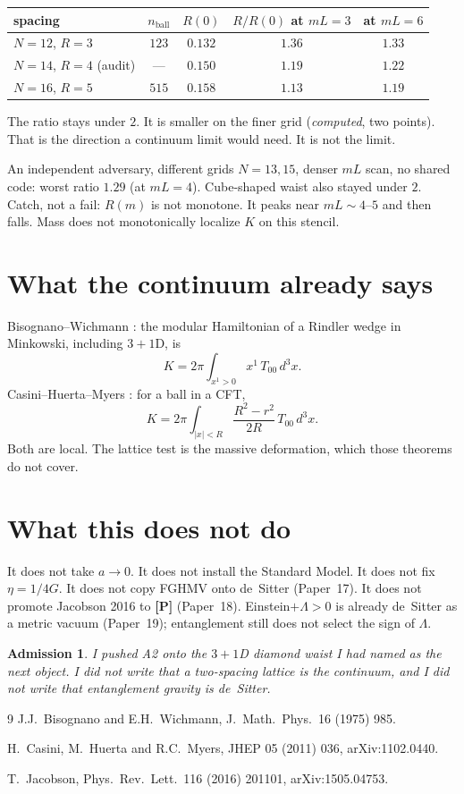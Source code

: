 \documentclass[11pt]{article}
\newcommand{\pP}{\textbf{[P]}}
\newtheorem*{admission}{Admission}
\begin{document}
\begin{center}
\begin{tabular}{lcccc}
\hline
spacing & $n_{\mathrm{ball}}$ & $R(0)$ & $R/R(0)$ at $mL=3$ & at $mL=6$ \\
\hline
$N=12$, $R=3$ & $123$ & $0.132$ & $1.36$ & $1.33$ \\
$N=14$, $R=4$ (audit) & --- & $0.150$ & $1.19$ & $1.22$ \\
$N=16$, $R=5$ & $515$ & $0.158$ & $1.13$ & $1.19$ \\
\hline
\end{tabular}
\end{center}

The ratio stays under $2$. It is smaller on the finer grid
(\emph{computed}, two points). That is the direction a continuum
limit would need. It is not the limit.

An independent adversary, different grids $N=13,15$, denser $mL$
scan, no shared code: worst ratio $1.29$ (at $mL=4$). Cube-shaped
waist also stayed under $2$. Catch, not a fail: $R(m)$ is not
monotone. It peaks near $mL\sim 4$--$5$ and then falls. Mass does
not monotonically localize $K$ on this stencil.

\section{What the continuum already says}

Bisognano--Wichmann \cite{BW1975}: the modular Hamiltonian of a
Rindler wedge in Minkowski, including $3{+}1$D, is
\[
K=2\pi\int_{x^1>0}x^1\,T_{00}\,d^3x.
\]
Casini--Huerta--Myers \cite{CHM2011}: for a ball in a CFT,
\[
K=2\pi\int_{|x|<R}\frac{R^2-r^2}{2R}\,T_{00}\,d^3x.
\]
Both are local. The lattice test is the massive deformation, which
those theorems do not cover.

\section{What this does not do}

It does not take $a\to 0$. It does not install the Standard Model.
It does not fix $\eta=1/4G$. It does not copy FGHMV onto de~Sitter
(Paper~17). It does not promote Jacobson 2016 to \pP{} (Paper~18).
Einstein$+\Lambda>0$ is already de~Sitter as a metric vacuum
(Paper~19); entanglement still does not select the sign of $\Lambda$.

\begin{admission}
I pushed A2 onto the $3{+}1$D diamond waist I had named as the
next object. I did not write that a two-spacing lattice is the
continuum, and I did not write that entanglement gravity is
de~Sitter.
\end{admission}

\begin{thebibliography}{9}
J.J.~Bisognano and E.H.~Wichmann,
J.\ Math.\ Phys.\ 16 (1975) 985.

H.~Casini, M.~Huerta and R.C.~Myers,
JHEP 05 (2011) 036,
arXiv:1102.0440.

T.~Jacobson,
Phys.\ Rev.\ Lett.\ 116 (2016) 201101,
arXiv:1505.04753.
\end{thebibliography}
\end{document}

